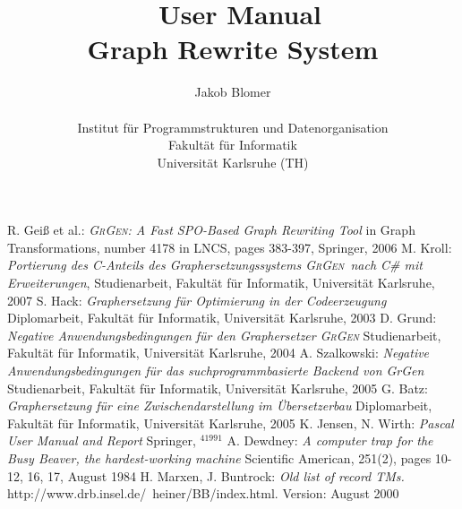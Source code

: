 \documentclass[a4paper,11pt]{report}
\title{\GrG\ User Manual \\ Graph Rewrite System}
\author{Jakob Blomer \\ \\ Institut für Programmstrukturen und Datenorganisation\\
Fakultät für Informatik\\
Universität Karlsruhe (TH)}
\providecommand{\GrG}{{\scshape GrGen}}
\begin{document}
\maketitle

\tableofcontents











 R. Geiß et al.: \emph{\GrG: A Fast SPO-Based Graph Rewriting Tool} in Graph Transformations, number 4178 in LNCS, pages 383-397, Springer, 2006
 M. Kroll: \emph{Portierung des C-Anteils des Graphersetzungssystems \GrG\ nach C\# mit Erweiterungen}, Studienarbeit, Fakultät für Informatik, Universität Karlsruhe, 2007
 S. Hack: \emph{Graphersetzung für Optimierung in der Codeerzeugung} Diplomarbeit, Fakultät für Informatik, Universität Karlsruhe, 2003
 D. Grund: \emph{Negative Anwendungsbedingungen für den Graphersetzer \GrG} Studienarbeit, Fakultät für Informatik, Universität Karlsruhe, 2004 
 A. Szalkowski: \emph{Negative Anwendungsbedingungen für das suchprogrammbasierte Backend von GrGen} Studienarbeit, Fakultät für Informatik, Universität Karlsruhe, 2005
 G. Batz: \emph{Graphersetzung für eine Zwischendarstellung im Übersetzerbau} Diplomarbeit, Fakultät für Informatik, Universität Karlsruhe, 2005
 K. Jensen, N. Wirth: \emph{Pascal User Manual and Report} Springer, $^41991$
 A. Dewdney: \emph{A computer trap for the Busy Beaver, the hardest-working machine} Scientific American, 251(2), pages 10-12, 16, 17, August 1984
 H. Marxen, J. Buntrock: \emph{Old list of record TMs.}\\ http://www.drb.insel.de/~heiner/BB/index.html. Version: August 2000
\end{document}
